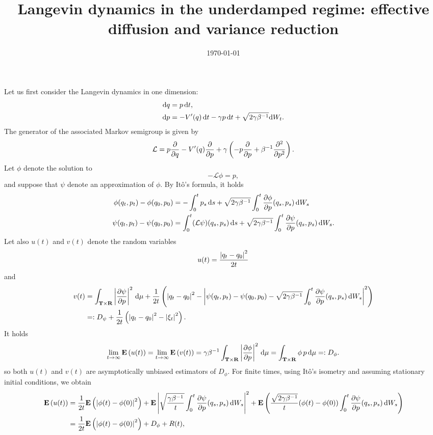 \documentclass[11pt,a4paper]{article}
\date{\today}
\title{Langevin dynamics in the underdamped regime: effective diffusion and variance reduction }
\author{%
}
\newcommand{\expect}[0]{\mathbf{E}}
\newcommand{\real}{\mathbf R}
\newcommand{\torus}{\mathbf T}
\renewcommand{\d}{\mathrm d}
\theoremstyle{plain}
\numberwithin{equation}{section}
\begin{document}
\maketitle
Let us first consider the Langevin dynamics in one dimension:
\begin{align*}
    \d q &= p \, \d t, \\
    \d p &= - \derivative*{1}[V]{q}(q) \, \d t - \gamma p \, \d t + \sqrt{2 \gamma \beta^{-1}} \d W_t.
\end{align*}
The generator of the associated Markov semigroup is given by
\[
    \mathcal L = p \derivative{1}{q} - \derivative*{1}[V]{q}(q) \derivative{1}{p} + \gamma \left( - p \derivative{1}{p} + \beta^{-1} \derivative{2}{p^2} \right).
\]
Let $\phi$ denote the solution to
\[
    - \mathcal L \phi = p,
\]
and suppose that $\psi$ denote an approximation of $\phi$.
By It\^o's formula, it holds
\begin{align*}
    \phi(q_t, p_t) - \phi(q_0, p_0) &= - \int_{0}^{t} p_s \, \d s + \sqrt{2 \gamma \beta^{-1}} \int_{0}^{t} \derivative{1}[\phi]{p}(q_s, p_s) \, \d W_s \\
    \psi(q_t, p_t) - \psi(q_0, p_0) &= \int_{0}^{t} (\mathcal L \psi) (q_s, p_s) \, \d s + \sqrt{2 \gamma \beta^{-1}} \int_{0}^{t} \derivative{1}[\psi]{p}(q_s, p_s) \, \d W_s.
\end{align*}
Let also $u(t)$ and $v(t)$ denote the random variables
\[
    u(t) = \frac{\abs{q_t - q_0}^2}{2t}
\]
and
\begin{align*}
    v(t) &= \int_{\torus \times \real} \abs{\derivative{1}[\psi]{p}}^2 \, \d \mu + \frac{1}{2t} \left( \abs{q_t - q_0}^2 - \abs{\psi(q_t, p_t) - \psi(q_0, p_0) - \sqrt{2 \gamma \beta^{-1}} \int_{0}^{t} \derivative{1}[\psi]{p}(q_s, p_s) \, \d W_s}^2\right) \\
         &=: D_{\psi}+ \frac{1}{2t} \left( \abs{q_t - q_0}^2 - \abs{\xi_t}^2\right).
\end{align*}
It holds
\[
    \lim_{t \to \infty} \expect \left( u(t) \right) = \lim_{t \to \infty} \expect \left( v(t) \right)
    = \gamma \beta^{-1} \int_{\torus \times \real} \abs{\derivative{1}[\phi]{p}}^2 \, \d \mu
    = \int_{\torus \times \real} \phi \, p \, \d \mu =: D_{\phi}.
\]
so both $u(t)$ and $v(t)$ are asymptotically unbiased estimators of $D_{\phi}$.
For finite times, using It\^o's isometry and assuming stationary initial conditions, we obtain
\begin{align*}
    \expect \left( u(t) \right)
    &= \frac{1}{2t} \expect \left( \abs{\phi(t) - \phi(0)}^2 \right) + \expect \abs{ \sqrt{\frac{\gamma \beta^{-1}}{t}} \int_{0}^{t} \derivative{1}[\psi]{p}(q_s, p_s) \, \d W_s}^2 + \expect \left( \frac{\sqrt{2 \gamma \beta^{-1}}}{t} (\phi(t) - \phi(0))  \int_{0}^{t} \derivative{1}[\psi]{p}(q_s, p_s) \, \d W_s \right) \\
    &= \frac{1}{2t} \expect \left( \abs{\phi(t) - \phi(0)}^2\right) + D_{\phi} + R(t),
\end{align*}
\end{document}
